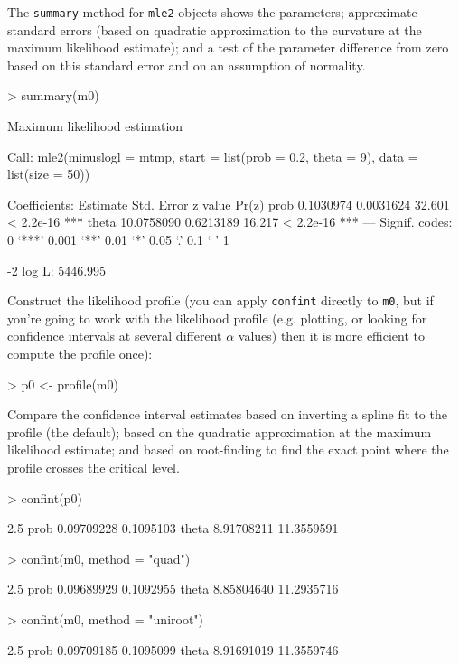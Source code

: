 \documentclass{article}
\newcommand{\code}[1]{{\tt #1}}
\begin{document}
The \code{summary} method for \code{mle2} objects
shows the parameters; approximate standard
errors (based on quadratic approximation to the curvature at
the maximum likelihood estimate); and a test
of the parameter difference from zero based on
this standard error and on an assumption of normality.

\begin{Schunk}
\begin{Sinput}
> summary(m0)
\end{Sinput}
\begin{Soutput}
Maximum likelihood estimation

Call:
mle2(minuslogl = mtmp, start = list(prob = 0.2, theta = 9), data = list(size = 50))

Coefficients:
        Estimate Std. Error z value     Pr(z)    
prob   0.1030974  0.0031624  32.601 < 2.2e-16 ***
theta 10.0758090  0.6213189  16.217 < 2.2e-16 ***
---
Signif. codes:  0 ‘***’ 0.001 ‘**’ 0.01 ‘*’ 0.05 ‘.’ 0.1 ‘ ’ 1 

-2 log L: 5446.995 
\end{Soutput}
\end{Schunk}

Construct the likelihood profile (you can
apply \code{confint} directly to \code{m0},
but if you're going to work with the likelihood
profile (e.g. plotting, or looking for confidence
intervals at several different $\alpha$ values)
then it is more efficient to compute the profile
once):

\begin{Schunk}
\begin{Sinput}
> p0 <- profile(m0)
\end{Sinput}
\end{Schunk}

Compare the confidence interval estimates based on
inverting a spline fit to the profile (the default);
based on the quadratic approximation at the
maximum likelihood estimate; and based on
root-finding to find the exact point where the
profile crosses the critical level.

\begin{Schunk}
\begin{Sinput}
> confint(p0)
\end{Sinput}
\begin{Soutput}
           2.5 %
prob  0.09709228  0.1095103
theta 8.91708211 11.3559591
\end{Soutput}
\begin{Sinput}
> confint(m0, method = "quad")
\end{Sinput}
\begin{Soutput}
           2.5 %
prob  0.09689929  0.1092955
theta 8.85804640 11.2935716
\end{Soutput}
\begin{Sinput}
> confint(m0, method = "uniroot")
\end{Sinput}
\begin{Soutput}
           2.5 %
prob  0.09709185  0.1095099
theta 8.91691019 11.3559746
\end{Soutput}
\end{Schunk}
\end{document}
